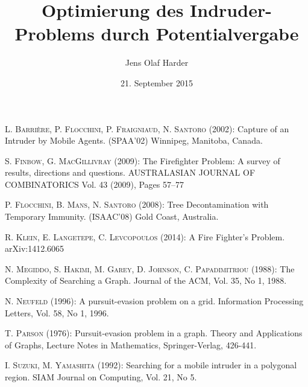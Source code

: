 \documentclass[12pt, a4paper, german]{article}
\author{Jens Olaf Harder}
\date{21. September 2015}
\title{Optimierung des Indruder-Problems durch Potentialvergabe}
\begin{document}
%	
	
	\thispagestyle{empty}
	\cleardoublepage
	\pagestyle{empty}
	

	\pagestyle{plain}
	\tableofcontents
	
	\newpage
	
	
	
	
	

	
	
	
	
	
	
	\newpage

	\renewcommand{\refname}{Literaturquellen}
	
	\begin{thebibliography}{99}
		
		
		 \textsc{L. Barrière, P. Flocchini, P. Fraigniaud, N. Santoro} (2002): Capture of an Intruder by Mobile Agents. (SPAA'02) Winnipeg, Manitoba, Canada.
		
		 \textsc{S. Finbow, G. MacGillivray} (2009): The Firefighter Problem: A survey of results, directions and questions.
		AUSTRALASIAN JOURNAL OF COMBINATORICS Vol. 43 (2009), Pages 57–77
		
		 \textsc{P. Flocchini, B. Mans, N. Santoro} (2008): Tree Decontamination with Temporary Immunity. (ISAAC'08) Gold Coast, Australia.
		
		 \textsc{R. Klein, E. Langetepe, C.  Levcopoulos} (2014): A Fire Fighter's Problem. arXiv:1412.6065
		
		 \textsc{N. Megiddo, S. Hakimi, M. Garey, D. Johnson, C. Papadimitriou} (1988): The Complexity of Searching a Graph. Journal of the ACM, Vol. 35, No 1, 1988.
				
		 \textsc{N. Neufeld} (1996): A pursuit-evasion problem on a grid. Information Processing Letters, Vol. 58, No 1, 1996.
		
		 \textsc{T. Parson} (1976): Pursuit-evasion problem in a graph. Theory and Applications of Graphs, Lecture Notes in Mathematics, Springer-Verlag, 426-441.

		 \textsc{I. Suzuki, M. Yamashita} (1992): Searching for a mobile intruder in a polygonal region. SIAM Journal on Computing, Vol. 21, No 5.
	

		
	\end{thebibliography} 
	
	
\end{document}
